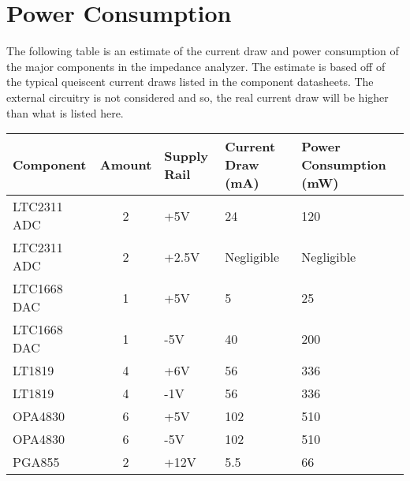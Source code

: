 \chapter{Power Consumption} \label{App:PowerConsumption}

The following table  is an estimate of the current draw and power consumption of the major components in the impedance analyzer.
The estimate is based off of the typical queiscent current draws listed in the component datasheets. The external circuitry is not considered and so, the real current draw will be higher than what is listed here.

        \begin{table}[ht]
            \centering
            \begin{tabular}{@{}lcp{1.5cm}p{1.8cm}p{2cm}@{}}
            \toprule
            \textbf{Component}       & \textbf{Amount} & \textbf{Supply Rail} & \textbf{Current Draw (mA)} & \textbf{Power Consumption (mW)} \\ \midrule
            LTC2311 ADC              & 2               & +5V                  & 24                         & 120                              \\
            LTC2311 ADC              & 2               & +2.5V                & Negligible                 & Negligible                       \\
            LTC1668 DAC              & 1               & +5V                  & 5                          & 25                               \\
            LTC1668 DAC              & 1               & -5V                  & 40                        & 200                              \\
            LT1819                   & 4               & +6V                  & 56                         & 336                             \\
            LT1819                   & 4               & -1V                  & 56                         & 336                              \\
            OPA4830                  & 6               & +5V                  & 102                         & 510                             \\
            OPA4830                  & 6               & -5V                  & 102                         & 510                             \\
            PGA855                   & 2               & +12V                 & 5.5                        & 66                              \\

\end{tabular}
\end{table}
